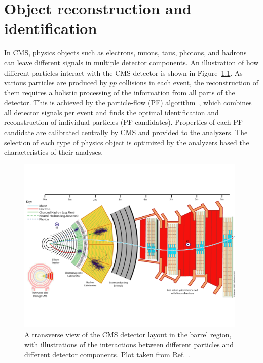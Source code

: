 \chapter{Object reconstruction and identification}\label{chp:objects}

In CMS, physics objects such as electrons, muons, taus, photons, and hadrons 
can leave different signals in multiple detector components.
An illustration of how different particles interact with the CMS detector is shown in Figure~\ref{fig:cms_interact}.
As various particles are produced by $pp$ collisions in each event, 
the reconstruction of them requires a holistic processing of the information from all parts of the detector. 
This is achieved by the particle-flow (PF) algorithm~\cite{Sirunyan_2017}, which combines all detector signals per event
and finds the optimal identification and reconstruction of individual particles (PF candidates).
Properties of each PF candidate are calibrated centrally by CMS and provided to the analyzers.
The selection of each type of physics object is optimized by the analyzers based the characteristics of their analyses.

\begin{figure}[!htb]
    \centering
    \captionsetup{justification=justified}
    \includegraphics[width=0.98\textwidth]{pics/object_reco/CMS Slice.pdf}
    \caption{A transverse view of the CMS detector layout in the barrel region,
             with illustrations of the interactions between different particles and different detector components.
             Plot taken from Ref.~\cite{Davis:2205172}.}
    \label{fig:cms_interact}
\end{figure}

